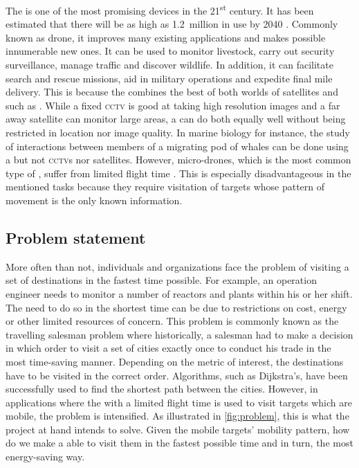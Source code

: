 \documentclass[../main.tex]{subfiles}
\begin{document}
The \uav is one of the most promising devices in the 
21\textsuperscript{st} century. It has been estimated that
there will be as high as \SI{1.2}{million} \uavs in use 
by 2040 \cite{Amo19}. 
Commonly known as drone, 
it improves many existing applications and makes possible 
innumerable new ones. It can be used to monitor livestock, 
carry out security surveillance, manage traffic 
and discover wildlife.
In addition, it can facilitate search and rescue missions,
aid in military operations and expedite final mile delivery.
This is because the \uav combines the best of both worlds
of satellites and \csns such as \cctvs.
While a fixed \textsc{cctv} is good at taking 
high resolution images and a far away satellite can monitor
large areas, a \uav can do both equally well without 
being restricted in location nor image quality. 
In marine biology for instance,  
the study of interactions between members of a migrating 
pod of whales can be done using a \uav but not 
\textsc{cctv}s nor satellites.
However, micro-drones, which is the most common type of \uavs,
suffer from limited flight time \cite{Sha19}. 
This is especially disadvantageous in
the mentioned tasks because they require visitation of targets
whose pattern of movement is the only known information.

\subsection{Problem statement}

More often than not, individuals and organizations face the problem
of visiting a set of destinations in the fastest time 
possible.
For example, an operation engineer needs to monitor
a number of reactors and plants within his or her shift.
The need to do so in the shortest time can be due to restrictions on
cost, energy or other limited resources of concern.
This problem is commonly known as the travelling salesman problem
where historically, a salesman had to make a decision in which order
to visit a set of cities exactly once to conduct his trade
in the most time-saving manner.
Depending on the metric of interest, 
the destinations have to be visited in the correct order.
Algorithms, such as Dijkstra's, have been successfully used 
to find the shortest path between the cities.
However, in applications where the \uav with a limited
flight time is used to 
visit targets which are mobile, the problem is intensified.
As illustrated in \cref{fig:problem}, this
is what the project at hand intends to solve.
Given the mobile targets' mobility pattern,
how do we make a \uav able to visit them
in the fastest possible time and in turn, 
the most energy-saving way.  
\end{document}
